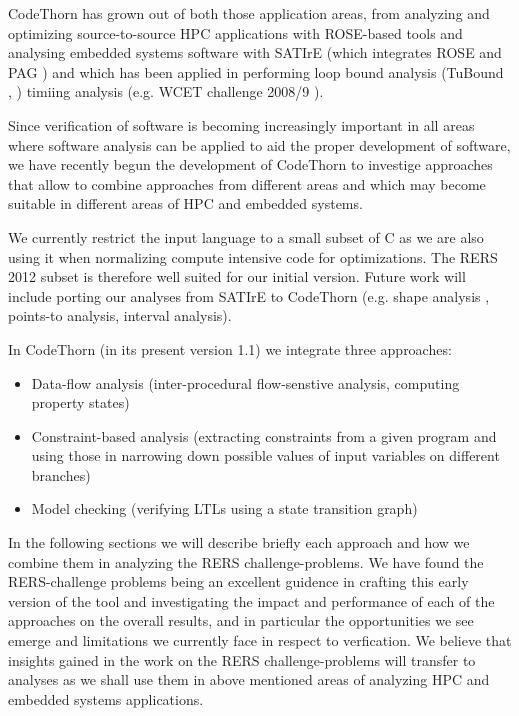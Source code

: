 \documentclass[natbib]{article}
\begin{document}
CodeThorn has grown out of both those application areas, from
analyzing and optimizing source-to-source HPC applications \cite{MS-QSMK04CPA} with
ROSE-based tools \cite{RoseWWW,MS-SCAM05} and analysing embedded systems
software with SATIrE \cite{SatireWWW} (which integrates ROSE and PAG \cite{martin-pag}) and
which has been applied in performing loop bound analysis (TuBound \cite{Prantl:SK08}, \cite{Kirner:SOSYM2010}) timiing
analysis (e.g. WCET challenge 2008/9 \cite{Prantl:WCET2009}).

Since verification of software is becoming increasingly important in
all areas where software analysis can be applied to aid the proper
development of software, we have recently begun the development of
CodeThorn to investige approaches that allow to combine approaches
from different areas and which may become suitable in different areas
of HPC and embedded systems.

We currently restrict the input language to a small subset of C as we
are also using it when normalizing compute intensive code for
optimizations. The RERS 2012 subset is therefore well suited for our
initial version. Future work will include porting our analyses from
SATIrE to CodeThorn (e.g. shape analysis \cite{scam2011},
points-to analysis, interval analysis).

In CodeThorn (in its present version 1.1) we integrate three approaches:

\begin{itemize}
\item Data-flow analysis (inter-procedural flow-senstive analysis, computing property states) 
\item Constraint-based analysis (extracting constraints from a given program and using those in narrowing down possible values of input variables on different branches)
\item Model checking (verifying LTLs using a state transition graph)
\end{itemize}

In the following sections we will describe briefly each approach and
how we combine them in analyzing the RERS challenge-problems. We have
found the RERS-challenge problems being an excellent guidence in
crafting this early version of the tool and investigating the impact
and performance of each of the approaches on the overall results, and
in particular the opportunities we see emerge and limitations we
currently face in respect to verfication. We believe that insights
gained in the work on the RERS challenge-problems will transfer to
analyses as we shall use them in above mentioned areas of analyzing HPC and
embedded systems applications.






\end{document}
